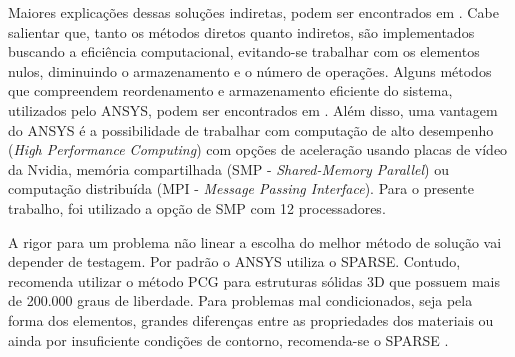Maiores explicações dessas soluções indiretas, podem ser encontrados em . Cabe salientar que, tanto os métodos diretos quanto indiretos, são implementados buscando a eficiência computacional, evitando-se trabalhar com os elementos nulos, diminuindo o armazenamento e o número de operações. Alguns métodos que compreendem reordenamento e armazenamento eficiente do sistema, utilizados pelo ANSYS, podem ser encontrados em . Além disso, uma vantagem do ANSYS é a possibilidade de trabalhar com computação de alto desempenho (\textit{High Performance Computing}) com opções de aceleração usando placas de vídeo da Nvidia, memória compartilhada (SMP - \textit{Shared-Memory Parallel}) ou computação distribuída (MPI - \textit{Message Passing Interface}). Para o presente trabalho, foi utilizado a opção de SMP com 12 processadores.

A rigor para um problema não linear a escolha do melhor método de solução vai depender de testagem. Por padrão o ANSYS utiliza o SPARSE. Contudo, recomenda utilizar o método PCG para estruturas sólidas 3D que possuem mais de 200.000 graus de liberdade. Para problemas mal condicionados, seja pela forma dos elementos, grandes diferenças entre as propriedades dos materiais ou ainda por insuficiente condições de contorno, recomenda-se o SPARSE \cite[p. 242]{ANSYS2018b}.

